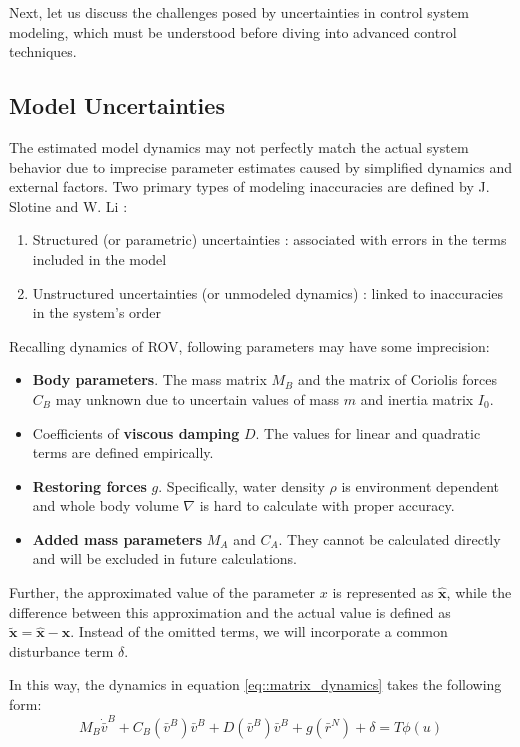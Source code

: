     Next, let us discuss the challenges posed by uncertainties in control system modeling, 
    which must be understood before diving into advanced control techniques.

\subsection{Model Uncertainties}

    The estimated model dynamics may not perfectly match the actual system behavior 
    due to imprecise parameter estimates caused by simplified dynamics 
    and external factors. Two primary types of modeling inaccuracies 
    are defined by J. Slotine and W. Li \cite{slotine_applied}:
    \begin{enumerate}
        \item Structured (or parametric) uncertainties : 
        associated with errors in the terms included in the model
        \item Unstructured uncertainties (or unmodeled dynamics) : 
        linked to inaccuracies in the system's order
    \end{enumerate}

    Recalling dynamics of ROV, following parameters may have some imprecision:
    \begin{itemize}
        \item \textbf{Body parameters}. The mass matrix $M_B$ and the matrix of Coriolis forces $C_B$ 
        may unknown due to uncertain values of mass $m$ and inertia matrix $I_0$.
        \item Coefficients of \textbf{viscous damping} $D$. The values for linear and quadratic 
        terms are defined empirically.
        \item \textbf{Restoring forces} $g$. Specifically, water density $\rho$ is environment dependent 
        and whole body volume $\nabla$ is hard to calculate with proper accuracy.
        \item \textbf{Added mass parameters} $M_A$ and $C_A$. They cannot be calculated directly and will 
        be excluded in future calculations.
    \end{itemize}
    Further, the approximated value of the parameter $x$ is represented as $\mathbf{\hat x}$,
    while the difference between this approximation and the actual value is 
    defined as $\mathbf{\tilde x = \hat x - x}$. Instead of the omitted terms, we will incorporate a common disturbance 
    term $\delta$.

    In this way, the dynamics in equation \ref{eq::matrix_dynamics} takes the following form:
    \begin{equation}
        M_B \dot{\bar{v}}^B + C_B(\bar{v}^B) \bar{v}^B+D(\bar{v}^B) \bar{v}^B+g(\bar{r}^N)
            + \delta = T\phi(u)
    \end{equation}

